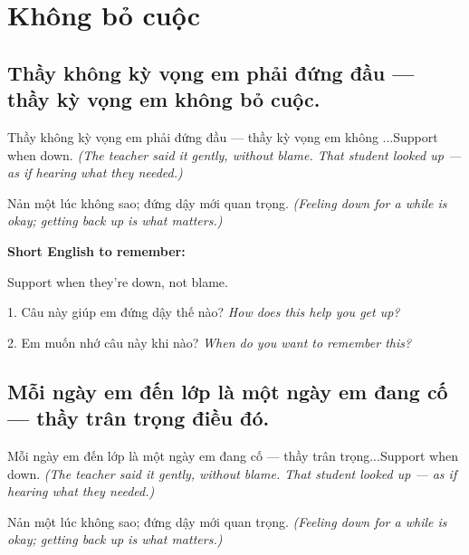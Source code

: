 \chapter{Không bỏ cuộc}


\section{Thầy không kỳ vọng em phải đứng đầu — thầy kỳ vọng em không bỏ cuộc.}
\begin{truyen}{Thầy không kỳ vọng em phải đứng đầu — thầy kỳ vọng em không ...}{Support when down.}
\textit{(The teacher said it gently, without blame. That student looked up — as if hearing what they needed.)}
\end{truyen}

\begin{baihoc}
Nản một lúc không sao; đứng dậy mới quan trọng.
\textit{(Feeling down for a while is okay; getting back up is what matters.)}
\end{baihoc}

\begin{ghinhoanh}
\textbf{Short English to remember:}

Support when they're down, not blame.

\end{ghinhoanh}

\begin{tuhocnhanh}
1. Câu này giúp em đứng dậy thế nào? \textit{How does this help you get up?}

2. Em muốn nhớ câu này khi nào? \textit{When do you want to remember this?}
\end{tuhocnhanh}
\ngancach


\section{Mỗi ngày em đến lớp là một ngày em đang cố — thầy trân trọng điều đó.}
\begin{truyen}{Mỗi ngày em đến lớp là một ngày em đang cố — thầy trân trọng...}{Support when down.}
\textit{(The teacher said it gently, without blame. That student looked up — as if hearing what they needed.)}
\end{truyen}

\begin{baihoc}
Nản một lúc không sao; đứng dậy mới quan trọng.
\textit{(Feeling down for a while is okay; getting back up is what matters.)}
\end{baihoc}

